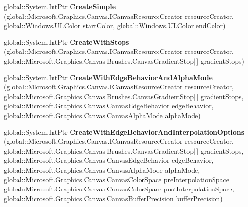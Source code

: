 \begin{DoxyCompactItemize}
\item 
\mbox{\label{interface_microsoft_1_1_graphics_1_1_canvas_1_1_brushes_1_1_i_canvas_linear_gradient_brush_factory_a78c231bcdcbc03cdff5653d4a83c5a0c}} 
global\+::\+System.\+Int\+Ptr {\bfseries Create\+Simple} (global\+::\+Microsoft.\+Graphics.\+Canvas.\+I\+Canvas\+Resource\+Creator resource\+Creator, global\+::\+Windows.\+U\+I.\+Color start\+Color, global\+::\+Windows.\+U\+I.\+Color end\+Color)
\item 
\mbox{\label{interface_microsoft_1_1_graphics_1_1_canvas_1_1_brushes_1_1_i_canvas_linear_gradient_brush_factory_a15abf4d37603e12682acbddc2f22388f}} 
global\+::\+System.\+Int\+Ptr {\bfseries Create\+With\+Stops} (global\+::\+Microsoft.\+Graphics.\+Canvas.\+I\+Canvas\+Resource\+Creator resource\+Creator, global\+::\+Microsoft.\+Graphics.\+Canvas.\+Brushes.\+Canvas\+Gradient\+Stop\mbox{[}$\,$\mbox{]} gradient\+Stops)
\item 
\mbox{\label{interface_microsoft_1_1_graphics_1_1_canvas_1_1_brushes_1_1_i_canvas_linear_gradient_brush_factory_ac50e085f44297985d380ec66a1b03c11}} 
global\+::\+System.\+Int\+Ptr {\bfseries Create\+With\+Edge\+Behavior\+And\+Alpha\+Mode} (global\+::\+Microsoft.\+Graphics.\+Canvas.\+I\+Canvas\+Resource\+Creator resource\+Creator, global\+::\+Microsoft.\+Graphics.\+Canvas.\+Brushes.\+Canvas\+Gradient\+Stop\mbox{[}$\,$\mbox{]} gradient\+Stops, global\+::\+Microsoft.\+Graphics.\+Canvas.\+Canvas\+Edge\+Behavior edge\+Behavior, global\+::\+Microsoft.\+Graphics.\+Canvas.\+Canvas\+Alpha\+Mode alpha\+Mode)
\item 
\mbox{\label{interface_microsoft_1_1_graphics_1_1_canvas_1_1_brushes_1_1_i_canvas_linear_gradient_brush_factory_a9ce58dca444a71a516ca277d025d8693}} 
global\+::\+System.\+Int\+Ptr {\bfseries Create\+With\+Edge\+Behavior\+And\+Interpolation\+Options} (global\+::\+Microsoft.\+Graphics.\+Canvas.\+I\+Canvas\+Resource\+Creator resource\+Creator, global\+::\+Microsoft.\+Graphics.\+Canvas.\+Brushes.\+Canvas\+Gradient\+Stop\mbox{[}$\,$\mbox{]} gradient\+Stops, global\+::\+Microsoft.\+Graphics.\+Canvas.\+Canvas\+Edge\+Behavior edge\+Behavior, global\+::\+Microsoft.\+Graphics.\+Canvas.\+Canvas\+Alpha\+Mode alpha\+Mode, global\+::\+Microsoft.\+Graphics.\+Canvas.\+Canvas\+Color\+Space pre\+Interpolation\+Space, global\+::\+Microsoft.\+Graphics.\+Canvas.\+Canvas\+Color\+Space post\+Interpolation\+Space, global\+::\+Microsoft.\+Graphics.\+Canvas.\+Canvas\+Buffer\+Precision buffer\+Precision)

\end{DoxyCompactItemize}
